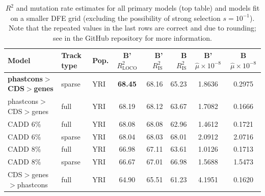 \documentclass[11pt]{article}
\begin{document}
\begin{table}
    \label{supp:tbl-r2}
\centering
\caption{$R^2$ and mutation rate estimates for all primary models (top table)
    and models fit on a smaller DFE grid (excluding the possibility of strong
    selection $s=10^{-1}$). Note that the repeated values in the last rows are
    correct and due to rounding; see  in the
    GitHub repository for more information.}
\begin{tabular}{lll|crr|cc}
    \textbf{Model} & \textbf{Track type} & \textbf{Pop.} & \textbf{B' $R_\text{LOCO}^2$} & \textbf{B' $R_\text{IS}^2$} & \textbf{B $R_\text{IS}^2$} & \textbf{B' $\hat{\mu} \times 10^{-8}$} & \textbf{B $\hat{\mu} \times 10^{-8}$} \\[0.5ex] 
\hline
\hline
    \textbf{phastcons$>$CDS$>$genes} &            sparse &          YRI &                        \textbf{68.45} &             68.16 &            65.23 &                                 1.8636 &                                0.2975 \\
phastcons$>$CDS$>$genes &              full &          YRI &                        68.19 &             68.12 &            63.67 &                                 1.7082 &                                0.1666 \\
               CADD 6\% &              full &          YRI &                        68.08 &             68.08 &            62.96 &                                 1.4612 &                                0.1721 \\
               CADD 6\% &            sparse &          YRI &                        68.04 &             68.03 &            68.01 &                                 2.0912 &                                2.0716 \\
               CADD 8\% &              full &          YRI &                        66.98 &             67.11 &            63.61 &                                 1.0126 &                                0.1713 \\
               CADD 8\% &            sparse &          YRI &                        66.67 &             67.01 &            66.98 &                                 1.5688 &                                1.5473 \\
CDS$>$genes$>$phastcons &              full &          YRI &                        64.90 &             65.51 &            61.23 &                                 4.1951 &                                0.1620 \\

\end{tabular}
\end{table}
\end{document}
